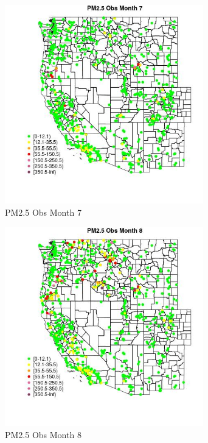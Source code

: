 \begin{figure} 
\centering  
\includegraphics[width=0.77\textwidth]{Code_Outputs/Report_ML_input_PM25_Step4_part_e_de_duplicated_aves_compiled_2019-05-21wNAs_MapObsMo7PM25_Obs.jpg} 
\caption{\label{fig:Report_ML_input_PM25_Step4_part_e_de_duplicated_aves_compiled_2019-05-21wNAsMapObsMo7PM25_Obs}PM2.5 Obs Month 7} 
\end{figure} 
 

\begin{figure} 
\centering  
\includegraphics[width=0.77\textwidth]{Code_Outputs/Report_ML_input_PM25_Step4_part_e_de_duplicated_aves_compiled_2019-05-21wNAs_MapObsMo8PM25_Obs.jpg} 
\caption{\label{fig:Report_ML_input_PM25_Step4_part_e_de_duplicated_aves_compiled_2019-05-21wNAsMapObsMo8PM25_Obs}PM2.5 Obs Month 8} 
\end{figure} 
 

